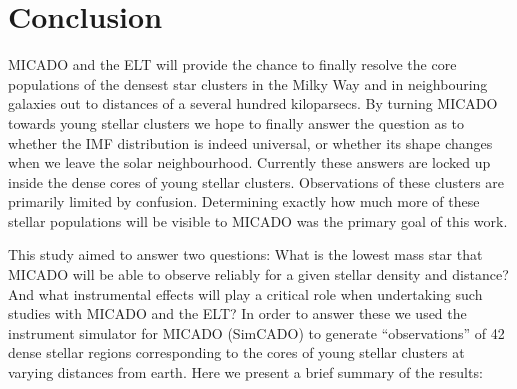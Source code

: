\section{Conclusion}
\label{sec:conclusion}

MICADO and the ELT will provide the chance to finally resolve the core populations of the densest star clusters in the Milky Way and in neighbouring galaxies out to distances of a several hundred kiloparsecs. By turning MICADO towards young stellar clusters we hope to finally answer the question as to whether the IMF distribution is indeed universal, or whether its shape changes when we leave the solar neighbourhood. Currently these answers are locked up inside the dense cores of young stellar clusters. Observations of these clusters are primarily limited by confusion. Determining exactly how much more of these stellar populations will be visible to MICADO was the primary goal of this work.

This study aimed to answer two questions: What is the lowest mass star that MICADO will be able to observe reliably for a given stellar density and distance? And what instrumental effects will play a critical role when undertaking such studies with MICADO and the ELT? In order to answer these we used the instrument simulator for MICADO (SimCADO) to generate ``observations'' of 42 dense stellar regions corresponding to the cores of young stellar clusters at varying distances from earth. Here we present a brief summary of the results:

